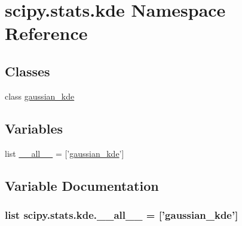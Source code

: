 \hypertarget{namespacescipy_1_1stats_1_1kde}{}\section{scipy.\+stats.\+kde Namespace Reference}
\label{namespacescipy_1_1stats_1_1kde}
\subsection*{Classes}
\begin{DoxyCompactItemize}
\item 
class \hyperlink{classscipy_1_1stats_1_1kde_1_1gaussian__kde}{gaussian\+\_\+kde}
\end{DoxyCompactItemize}
\subsection*{Variables}
\begin{DoxyCompactItemize}
\item 
list \hyperlink{namespacescipy_1_1stats_1_1kde_a4cf5feb8a3aeb01b6a13e9f23afbcddf}{\+\_\+\+\_\+all\+\_\+\+\_\+} = \mbox{[}'\hyperlink{classscipy_1_1stats_1_1kde_1_1gaussian__kde}{gaussian\+\_\+kde}'\mbox{]}
\end{DoxyCompactItemize}


\subsection{Variable Documentation}
\hypertarget{namespacescipy_1_1stats_1_1kde_a4cf5feb8a3aeb01b6a13e9f23afbcddf}{}
\subsubsection[{\+\_\+\+\_\+all\+\_\+\+\_\+}]{\setlength{\rightskip}{0pt plus 5cm}list scipy.\+stats.\+kde.\+\_\+\+\_\+all\+\_\+\+\_\+ = \mbox{[}'{\bf gaussian\+\_\+kde}'\mbox{]}}\label{namespacescipy_1_1stats_1_1kde_a4cf5feb8a3aeb01b6a13e9f23afbcddf}
